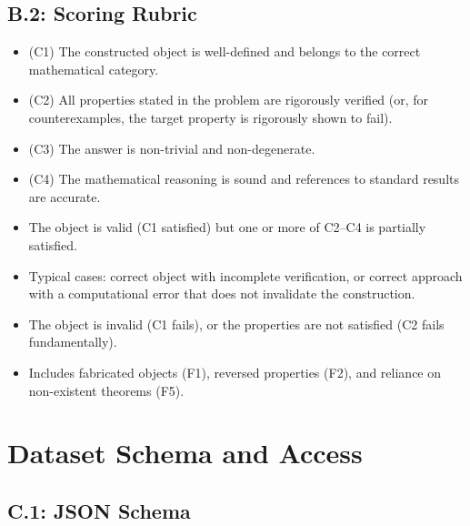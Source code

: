 \subsection*{B.2: Scoring Rubric}

\begin{description}[nosep]
  \item[Score 1.0 (Correct):] \hfill
  \begin{itemize}[nosep]
    \item (C1) The constructed object is well-defined and belongs to the correct mathematical category.
    \item (C2) All properties stated in the problem are rigorously verified (or, for counterexamples, the target property is rigorously shown to fail).
    \item (C3) The answer is non-trivial and non-degenerate.
    \item (C4) The mathematical reasoning is sound and references to standard results are accurate.
  \end{itemize}
  \item[Score 0.5 (Partial):] \hfill
  \begin{itemize}[nosep]
    \item The object is valid (C1 satisfied) but one or more of C2--C4 is partially satisfied.
    \item Typical cases: correct object with incomplete verification, or correct approach with a computational error that does not invalidate the construction.
  \end{itemize}
  \item[Score 0.0 (Incorrect):] \hfill
  \begin{itemize}[nosep]
    \item The object is invalid (C1 fails), or the properties are not satisfied (C2 fails fundamentally).
    \item Includes fabricated objects (F1), reversed properties (F2), and reliance on non-existent theorems (F5).
  \end{itemize}
\end{description}

\section{Dataset Schema and Access}
\label{app:schema}

\subsection*{C.1: JSON Schema}

